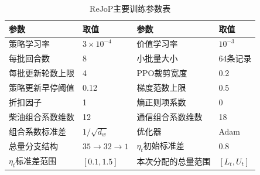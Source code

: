 \begin{table}[H]
 \centering
 \captionsetup{skip=8bp,belowskip=0pt}
 \caption{ReJoP主要训练参数表}
 \label{tab:formal-ch3-training}
 \begingroup\small
 \begin{tabular}{llll}
  \toprule
  参数 & 取值 & 参数 & 取值 \\
  \midrule
  策略学习率 & \(3\times10^{-4}\) & 价值学习率 & \(10^{-3}\) \\
  每批回合数 & 8 & 小批量大小 & 64条记录 \\
  每批更新轮数上限 & 4 & PPO裁剪宽度 & 0.2 \\
  策略更新早停阈值 & 0.12 & 梯度范数上限 & 0.5 \\
  折扣因子 & 1 & 熵正则项系数 & 0 \\
  柴油组合系数维数 & 12 & 通信组合系数维数 & 18 \\
  组合系数标准差 & \(1/\sqrt{d_w}\) & 优化器 & Adam \\
  总量分支结构 & \(35\to32\to1\) & \(\eta_t\)初始标准差 & 0.8 \\
  \(\eta_t\)标准差范围 & \([0.1,1.5]\) & 本次分配的总量范围 & \([L_t,U_t]\) \\
  \bottomrule
 \end{tabular}
 \endgroup
\end{table}
